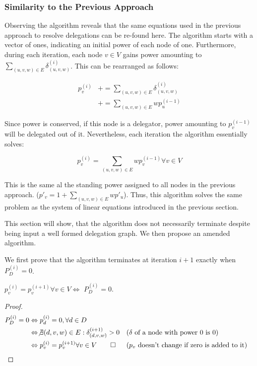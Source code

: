 \subsubsection{Similarity to the Previous Approach}

Observing the algorithm reveals that the same equations used in the previous approach to resolve delegations can be re-found here. The algorithm starts with a vector of ones, indicating an initial power of each node of one. Furthermore, during each iteration, each node $v \in V$ gains power amounting to $\sum_{(u, v, w) \in E} \delta^{(i)}_{(u, v, w)}$. This can be rearranged as follows:

\begin{align*}
p_v^{(i)} &+= \sum_{(u, v, w) \in E} \delta^{(i)}_{(u, v, w)} \\
&+= \sum_{(u, v, w) \in E} wp_u^{(i-1)}
\end{align*}

Since power is conserved, if this node is a delegator, power amounting to $p_v^{(i-1)}$ will be delegated out of it. Nevertheless, each iteration the algorithm essentially solves: 

\[
p_v^{(i)} = \sum_{(u, v, w) \in E} wp_v^{(i-1)} \forall v \in V
\]

This is the same al the standing power assigned to all nodes in the previous approach. ($p'_v = 1 + \sum_{(u, v, w) \in E} wp'_u$). Thus, this algorithm solves the same problem as the system of linear equations introduced in the previous section. 

This section will show, that the algorithm does not necessarily terminate despite being input a well formed delegation graph. We then propose an amended algorithm.

We first prove that the algorithm terminates at iteration $i+1$ exactly when $P_D^{(i)} = 0$.

\begin{lemma}\label{lem:simple_alg_terminates}
 $p_v^{(i)} = p_v^{(i+1)} \forall v \in V \Leftrightarrow$ $P_D^{(i)} = 0$.
\end{lemma}
\begin{proof}

\begin{align*}
	P_D^{(i)} = 0 
	&\Leftrightarrow p_d^{(i)} = 0, \forall d \in D \\
	&\Leftrightarrow \not\exists (d, v, w) \in E: \delta_{(d, v, w)}^{(i+1)} > 0  &&\text{($\delta$ of a node with power 0 is 0)}\\
	&\Leftrightarrow p_v^{(i)} = p_v^{(i+1)} \forall v \in V \qed  &&\text{($p_v$ doesn't change if zero is added to it)}
\end{align*}
\end{proof}


